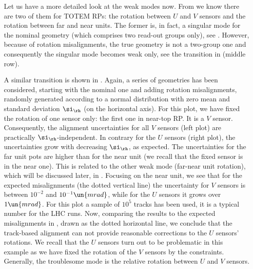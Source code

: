 Let us have a more detailed look at the weak modes now. From  we know there are two of them for TOTEM RPs: the rotation between $U$ and $V$ sensors and the rotation between far and near units. The former is, in fact, a singular mode for the nominal geometry (which comprises two read-out groups only), see . However, because of rotation misalignments, the true geometry is not a two-group one and consequently the singular mode becomes weak only, see the transition in  (middle row).

A similar transition is shown in . Again, a series of geometries has been considered, starting with the nominal one and adding rotation misalignments, randomly generated according to a normal distribution with zero mean and standard deviation $\si_\rh$ (on the horizontal axis). For this plot, we have fixed the rotation of one sensor only: the first one in near-top RP. It is a $V$ sensor. Consequently, the alignment uncertainties for all $V$ sensors (left plot) are practically $\si_\rh$-independent. In contrary for the $U$ sensors (right plot), the uncertainties grow with decreasing $\si_\rh$, as expected. The uncertainties for the far unit pots are higher than for the near unit (we recall that the fixed sensor is in the near one). This is related to the other weak mode (far-near unit rotation), which will be discussed later, in . Focusing on the near unit, we see that for the expected misalignments (the dotted vertical line) the uncertainty for $V$ sensors is between $10^{-2}$ and $10^{-1}\un{mrad}$, while for the $U$ sensors it grows over $1\un{mrad}$. For this plot a sample of $10^5$ tracks has been used, it is a typical number for the LHC runs. Now, comparing the results to the expected misalignments in , drawn as the dotted horizontal line, we conclude that the track-based alignment can not provide reasonable corrections to the $U$ sensors' rotations. We recall that the $U$ sensors turn out to be problematic in this example as we have fixed the rotation of the $V$ sensors by the constraints. Generally, the troublesome mode is the relative rotation between $U$ and $V$ sensors.

